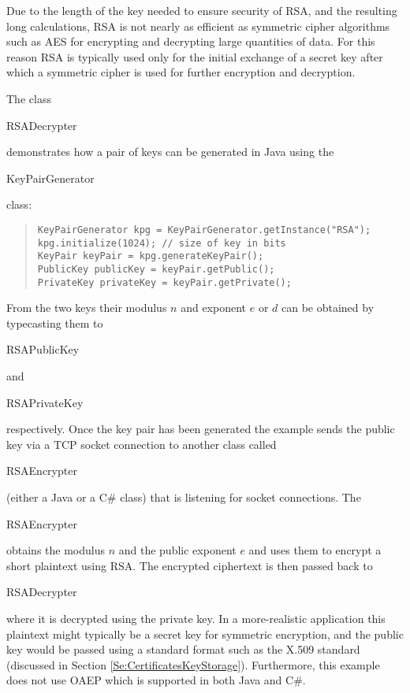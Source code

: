 Due to the length of the key needed to ensure security of RSA, and the resulting
long calculations, RSA is not nearly as efficient as symmetric cipher algorithms
such as AES for encrypting and decrypting large quantities of data.
For this reason RSA is typically used only for the initial exchange of a
secret key after which a symmetric cipher is used for further encryption and
decryption.

The class \begin{code}RSADecrypter\end{code} demonstrates how a pair
of keys can be generated in Java using the \begin{code}KeyPairGenerator\end{code}
class:
\begin{quote}\begin{code}\begin{verbatim}
KeyPairGenerator kpg = KeyPairGenerator.getInstance("RSA");
kpg.initialize(1024); // size of key in bits
KeyPair keyPair = kpg.generateKeyPair();
PublicKey publicKey = keyPair.getPublic();
PrivateKey privateKey = keyPair.getPrivate();
\end{verbatim}\end{code}\end{quote}
From the two keys their modulus $n$ and exponent $e$ or $d$ can be obtained
by typecasting them to \begin{code}RSAPublicKey\end{code} and
\begin{code}RSAPrivateKey\end{code} respectively.
Once the key pair has been generated the example sends the public key
via a TCP socket connection to another class called \begin{code}RSAEncrypter\end{code}
(either a Java or a C\# class) that is listening for socket connections.
The \begin{code}RSAEncrypter\end{code} obtains the modulus $n$ and the public
exponent $e$ and uses them to encrypt a short plaintext using RSA.
The encrypted ciphertext is then passed back to \begin{code}RSADecrypter\end{code}
where it is decrypted using the private key.
In a more-realistic application this plaintext might typically be a secret key
for symmetric encryption, and the public key would be passed using a standard format
such as the X.509 standard (discussed in Section \ref{Se:CertificatesKeyStorage}).
Furthermore, this example does not use OAEP which is supported in both Java and C\#.

